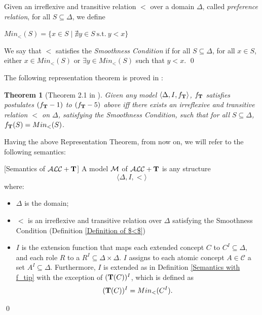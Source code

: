 \documentclass[a4paper, 11pt, oneside]{duthesis}
\newcommand{\tip}{{\bf T}}
\newcommand{\alct}{\mathcal{ALC}+\tip}
\newcommand{\tc} {\mid}
\newcommand{\emme} {\begin{mathcal}M\end{mathcal}}
\newenvironment{definition}
{\begin{defi} \rm}{\qed \end{defi}}
\newenvironment{definition}
{\begin{defi} \rm}{\qed \end{defi}}
\newtheorem{theorem}{Theorem}
\newtheorem{definition}{Definition}
\newcounter{posu}
\newtheorem{theorem}[posu]{Theorem}
\newtheorem{definition}[posu]{Definition}
\begin{document}
\begin{definition}\label{Definition of $<$} Given an irreflexive and transitive relation  $<$ over a domain $\Delta$, called \emph{preference relation}, for all $S \subseteq \Delta$, we define

$Min_<(S)= \{x \in S \tc \nexists y \in S \ \mbox{s.t.} \ y < x \}$

\noindent We say that $<$ satisfies the {\em Smoothness Condition} if for all $S \subseteq \Delta$, for all $x \in S$, either $x \in Min_<(S)$ or $\exists y \in  Min_<(S)$ such that $y < x$.
\end{definition}

\noindent The following representation theorem is proved in \cite{FI09}:

\begin{theorem}[Theorem 2.1 in \cite{FI09}]\label{rtrt} Given any model $\langle \Delta, I, f_\tip
\rangle$, $f_\tip$ satisfies postulates $(f_\tip-1)$ to $(f_\tip-5)$ above iff there exists  an irreflexive and transitive relation $<$ on $\Delta$, satisfying the Smoothness Condition, such that for all $S \subseteq \Delta$, $f_\tip(S) = Min_<(S)$.
\end{theorem}


\noindent Having the above Representation Theorem, from now on, we will refer to the following semantics:

\begin{definition}[Semantics of $\alct$]\label{Semantics of T} A model $\emme$ of $\alct$ is any structure $$\langle \Delta, I, < \rangle$$ where:

\begin{itemize}

\item $\Delta$ is the domain;

\item $<$ is an irreflexive and transitive relation over $\Delta$ satisfying the Smoothness Condition (Definition \ref{Definition of $<$})

\item $I$ is the extension function that maps each  extended concept $C$ to $C^I \subseteq \Delta$, and each role $R$ to a $R^I \subseteq \Delta \times \Delta$.
$I$ assigns to each atomic concept $A \in \mathcal{C}$ a set $A^I \subseteq \Delta$.
Furthermore, $I$ is extended as in Definition \ref{Semantics with f_tip} with the exception of $(\tip(C))^I$, which is defined as $$(\tip(C))^I = Min_<(C^I).$$
\end{itemize}

\end{definition}
\end{document}
